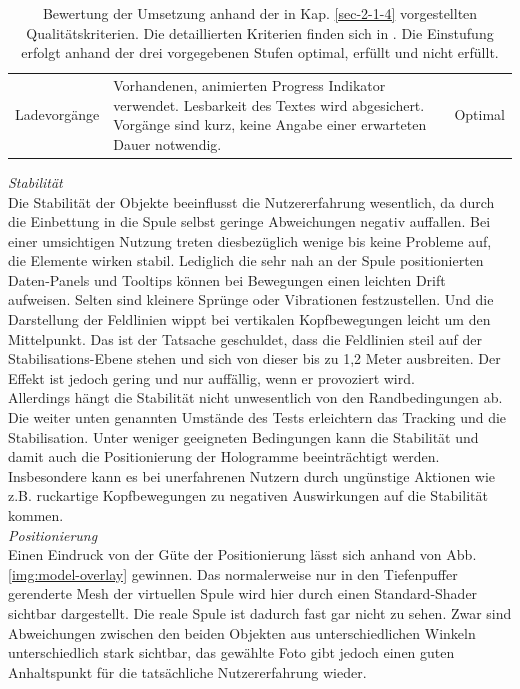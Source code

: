 \begin{landscape}
\begin{table}
\begin{tabular}{m{2.3cm}|m{15.5cm}|m{2cm}}
			\hline
			Ladevorgänge & Vorhandenen, animierten Progress Indikator verwendet. Lesbarkeit des Textes wird abgesichert. Vorgänge sind kurz, keine Angabe einer erwarteten Dauer notwendig. & Optimal\\
		\end{tabular}\caption{\label{tab:tech_results} Bewertung der Umsetzung anhand der in Kap. \ref{sec-2-1-4} vorgestellten Qualitätskriterien. Die detaillierten Kriterien finden sich in \cite{MRDoc}. Die Einstufung erfolgt anhand der drei vorgegebenen Stufen optimal, erfüllt und nicht erfüllt.}
	\end{table}
	\egroup
\end{landscape}

\textit{Stabilität}\\
Die Stabilität der Objekte beeinflusst die Nutzererfahrung wesentlich, da durch die Einbettung in die Spule selbst geringe Abweichungen negativ auffallen. Bei einer umsichtigen Nutzung treten diesbezüglich wenige bis keine Probleme auf, die Elemente wirken stabil. Lediglich die sehr nah an der Spule positionierten Daten-Panels und Tooltips können bei Bewegungen einen leichten Drift aufweisen. Selten sind kleinere Sprünge oder Vibrationen festzustellen. Und die Darstellung der Feldlinien wippt bei vertikalen Kopfbewegungen leicht um den Mittelpunkt. Das ist der Tatsache geschuldet, dass die Feldlinien steil auf der Stabilisations-Ebene stehen und sich von dieser bis zu 1,2 Meter ausbreiten. Der Effekt ist jedoch gering und nur auffällig, wenn er provoziert wird.\\

Allerdings hängt die Stabilität nicht unwesentlich von den Randbedingungen ab. Die weiter unten genannten Umstände des Tests erleichtern das Tracking und die Stabilisation. Unter weniger geeigneten Bedingungen kann die Stabilität und damit auch die Positionierung der Hologramme beeinträchtigt werden. Insbesondere kann es bei unerfahrenen Nutzern durch ungünstige Aktionen wie z.B. ruckartige Kopfbewegungen zu negativen Auswirkungen auf die Stabilität kommen.\\

\textit{Positionierung}\\
Einen Eindruck von der Güte der Positionierung lässt sich anhand von Abb. \ref{img:model-overlay} gewinnen. Das normalerweise nur in den Tiefenpuffer gerenderte Mesh der virtuellen Spule wird hier durch einen Standard-Shader sichtbar dargestellt. Die reale Spule ist dadurch fast gar nicht zu sehen. Zwar sind Abweichungen zwischen den beiden Objekten aus unterschiedlichen Winkeln unterschiedlich stark sichtbar, das gewählte Foto gibt jedoch einen guten Anhaltspunkt für die tatsächliche Nutzererfahrung wieder.\\

